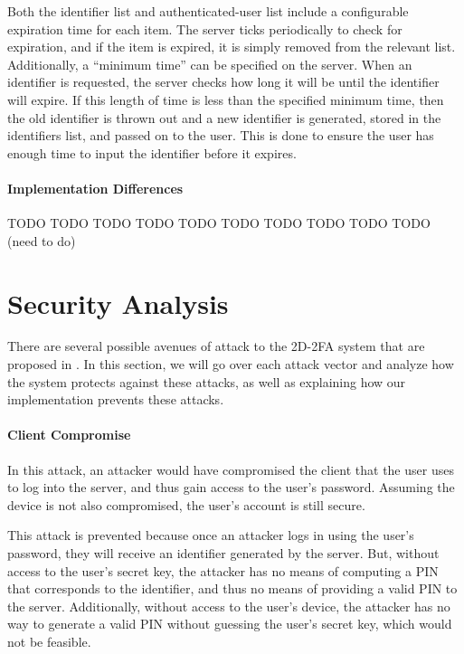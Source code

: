 \documentclass[11pt]{article}
\begin{document}
Both the identifier list and authenticated-user list include a
configurable expiration time for each item. The server ticks
periodically to check for expiration, and if the item is expired, it is
simply removed from the relevant list. Additionally, a ``minimum time''
can be specified on the server. When an identifier is requested, the
server checks how long it will be until the identifier will expire. If
this length of time is less than the specified minimum time, then the
old identifier is thrown out and a new identifier is generated, stored
in the identifiers list, and passed on to the user. This is done to
ensure the user has enough time to input the identifier before it
expires.

\paragraph{Implementation Differences}

TODO TODO TODO TODO TODO TODO TODO TODO TODO TODO (need to do)


\section{Security Analysis}

There are several possible avenues of attack to the 2D-2FA system that
are proposed in \cite{shirvanian2d2fa}. In this section, we will go over
each attack vector and analyze how the system protects against these
attacks, as well as explaining how our implementation prevents these
attacks. 

\paragraph{Client Compromise}
In this attack, an attacker would have compromised the client that the
user uses to log into the server, and thus gain access to the user's
password. Assuming the device is not also compromised, the user's
account is still secure. 

This attack is prevented because once an attacker logs in using the
user's password, they will receive an identifier generated by the
server. But, without access to the user's secret key, the attacker has
no means of computing a PIN that corresponds to the identifier, and
thus no means of providing a valid PIN to the server. Additionally,
without access to the user's device, the attacker has no way to generate
a valid PIN without guessing the user's secret key, which would not be
feasible. 
\end{document}
